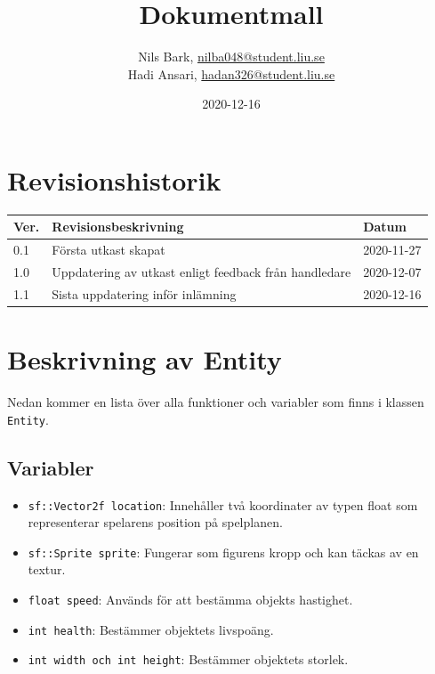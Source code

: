 \documentclass{TDP003mall}
\author{Nils Bark, \url{nilba048@student.liu.se}\\
  Hadi Ansari, \url{hadan326@student.liu.se}}
\title{Dokumentmall}
\date{2020-12-16}
\begin{document}
\projectpage
\section{Revisionshistorik}
\begin{table}[!h]
\begin{tabularx}{\linewidth}{|l|X|l|}
\hline
Ver. & Revisionsbeskrivning & Datum \\\hline
0.1 & Första utkast skapat & 2020-11-27\\\hline
1.0 & Uppdatering av utkast enligt feedback från handledare & 2020-12-07\\\hline
1.1 & Sista uppdatering inför inlämning & 2020-12-16\\\hline
\end{tabularx}
\end{table}

\section{Beskrivning av Entity}
Nedan kommer en lista över alla funktioner och variabler som finns i klassen \texttt{Entity}.
\subsection{Variabler}
\begin{itemize}
\item \texttt{sf::Vector2f location}: Innehåller två koordinater av typen float som representerar spelarens position på spelplanen.
\item \texttt{sf::Sprite sprite}: Fungerar som figurens kropp och kan täckas av en textur.
\item \texttt{float speed}: Används för att bestämma objekts hastighet. 
\item \texttt{int health}: Bestämmer objektets livspoäng.
\item \texttt{int width och int height}: Bestämmer objektets storlek.
\end{itemize}
\end{document}
